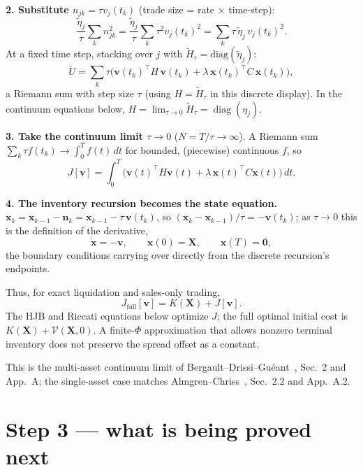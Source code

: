 \documentclass[11pt,a4paper]{article}
\begin{document}
\textbf{2. Substitute $n_{jk}=\tau v_j(t_k)$} (trade size = rate $\times$
time-step):
\[
\frac{\tilde\eta_j}{\tau}\sum_kn_{jk}^2=\frac{\tilde\eta_j}{\tau}\sum_k\tau^2
v_j(t_k)^2=\sum_k\tau\,\tilde\eta_j\,v_j(t_k)^2 .
\]
At a fixed time step, stacking over $j$ with $\widetilde H_\tau=\mathrm{diag}(\tilde\eta_j)$:
\[
\tilde U=\sum_k\tau\Big(\mathbf v(t_k)^\top H\,\mathbf v(t_k)+\lambda\,\mathbf
x(t_k)^\top C\,\mathbf x(t_k)\Big),
\]
a Riemann sum with step size $\tau$ (using $H=\widetilde H_\tau$
in this discrete display). In the continuum equations below,
$H=\lim_{\tau\to0}\widetilde H_\tau=\operatorname{diag}(\eta_j)$.

\textbf{3. Take the continuum limit $\tau\to0$} ($N=T/\tau\to\infty$). A
Riemann sum $\sum_k\tau f(t_k)\to\int_0^Tf(t)\,dt$ for bounded, (piecewise)
continuous $f$, so
\begin{equation}
J[\mathbf v]=\int_0^T\big(\mathbf v(t)^\top H\mathbf v(t)+\lambda\,\mathbf
x(t)^\top C\mathbf x(t)\big)\,dt .
\label{eq:J}
\end{equation}

\textbf{4. The inventory recursion becomes the state equation.}
$\mathbf x_k=\mathbf x_{k-1}-\mathbf n_k=\mathbf x_{k-1}-\tau\,\mathbf v(t_k)$,
so $(\mathbf x_k-\mathbf x_{k-1})/\tau=-\mathbf v(t_k)$; as $\tau\to0$ this is
the definition of the derivative,
\begin{equation}
\dot{\mathbf x}=-\mathbf v,\qquad \mathbf x(0)=\mathbf X,\qquad
\mathbf x(T)=\mathbf 0,
\label{eq:state}
\end{equation}
the boundary conditions carrying over directly from the discrete recursion's
endpoints.

Thus, for exact liquidation and sales-only trading,
\begin{equation}
J_{\mathrm{full}}[\mathbf v]=K(\mathbf X)+J[\mathbf v].
\end{equation}
The HJB and Riccati equations below optimize $J$; the full optimal initial cost
is $K(\mathbf X)+\mathcal V(\mathbf X,0)$. A finite-$\Phi$ approximation that
allows nonzero terminal inventory does not preserve the spread offset as a
constant.

This is the multi-asset continuum limit of
Bergault--Drissi--Gu\'eant~\cite{bergault2022}, Sec.~2 and App.~A; the
single-asset case matches Almgren--Chriss~\cite{almgrenchriss2000},
Sec.~2.2 and App.~A.2.

\section*{Step 3 --- what is being proved next}
\end{document}
